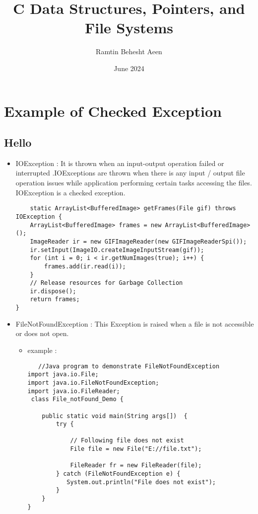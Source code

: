 \documentclass{article}
\title{C Data Structures, Pointers, and File Systems}
\author{Ramtin Behesht Aeen}
\date{June 2024}
\begin{document}
\maketitle

\section{Example of Checked Exception}
\subsection{Hello}
\begin{itemize}
    \item IOException : It is thrown when an input-output operation failed or interrupted .IOExceptions are thrown when there is any input / output file operation issues while application performing certain tasks accessing the files. IOException is a checked exception.
    
    \begin{itemize}
    \begin{lstlisting}
    static ArrayList<BufferedImage> getFrames(File gif) throws IOException {
    ArrayList<BufferedImage> frames = new ArrayList<BufferedImage>();
    ImageReader ir = new GIFImageReader(new GIFImageReaderSpi());
    ir.setInput(ImageIO.createImageInputStream(gif));
    for (int i = 0; i < ir.getNumImages(true); i++) {
        frames.add(ir.read(i));
    }
    // Release resources for Garbage Collection
    ir.dispose();
    return frames;
}
    \end{lstlisting}
    \end{itemize}
    \item FileNotFoundException : This Exception is raised when a file is not accessible or does not open.
    
    \begin{itemize}
    \item example :
    \begin{lstlisting}
   //Java program to demonstrate FileNotFoundException 
import java.io.File; 
import java.io.FileNotFoundException; 
import java.io.FileReader; 
 class File_notFound_Demo { 
  
    public static void main(String args[])  { 
        try { 
  
            // Following file does not exist 
            File file = new File("E://file.txt"); 
  
            FileReader fr = new FileReader(file); 
        } catch (FileNotFoundException e) { 
           System.out.println("File does not exist"); 
        } 
    } 
} 
    \end{lstlisting}
     \end{itemize}
    

\end{itemize}
\end{document}
